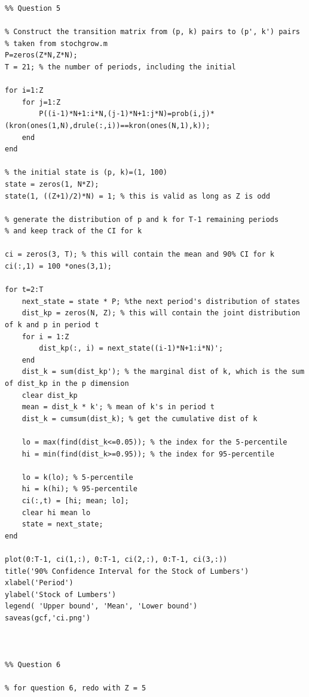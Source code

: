 \documentclass[12pt]{article}
\begin{document}
\begin{verbatim}
%% Question 5

% Construct the transition matrix from (p, k) pairs to (p', k') pairs
% taken from stochgrow.m
P=zeros(Z*N,Z*N);
T = 21; % the number of periods, including the initial

for i=1:Z
    for j=1:Z
        P((i-1)*N+1:i*N,(j-1)*N+1:j*N)=prob(i,j)*(kron(ones(1,N),drule(:,i))==kron(ones(N,1),k));
    end
end

% the initial state is (p, k)=(1, 100)
state = zeros(1, N*Z);
state(1, ((Z+1)/2)*N) = 1; % this is valid as long as Z is odd

% generate the distribution of p and k for T-1 remaining periods
% and keep track of the CI for k

ci = zeros(3, T); % this will contain the mean and 90% CI for k
ci(:,1) = 100 *ones(3,1);

for t=2:T
    next_state = state * P; %the next period's distribution of states
    dist_kp = zeros(N, Z); % this will contain the joint distribution of k and p in period t
    for i = 1:Z
        dist_kp(:, i) = next_state((i-1)*N+1:i*N)';
    end
    dist_k = sum(dist_kp'); % the marginal dist of k, which is the sum of dist_kp in the p dimension
    clear dist_kp
    mean = dist_k * k'; % mean of k's in period t
    dist_k = cumsum(dist_k); % get the cumulative dist of k
    
    lo = max(find(dist_k<=0.05)); % the index for the 5-percentile
    hi = min(find(dist_k>=0.95)); % the index for 95-percentile
    
    lo = k(lo); % 5-percentile
    hi = k(hi); % 95-percentile
    ci(:,t) = [hi; mean; lo];
    clear hi mean lo
    state = next_state;
end

plot(0:T-1, ci(1,:), 0:T-1, ci(2,:), 0:T-1, ci(3,:))
title('90% Confidence Interval for the Stock of Lumbers')
xlabel('Period')
ylabel('Stock of Lumbers')
legend( 'Upper bound', 'Mean', 'Lower bound')
saveas(gcf,'ci.png')



%% Question 6

% for question 6, redo with Z = 5
\end{verbatim}
\clearpage
\end{document}
